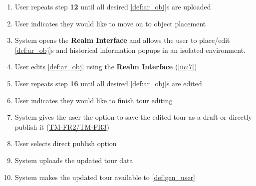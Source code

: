 \documentclass{article}
\begin{document}
\begin{enumerate}[label=\textbf{UC\arabic*}]
\begin{enumerate}[label=\textbf{\arabic*.}]
              \item User repeats step \textbf{12} until all desired \ref{def:ar_obj}s are uploaded
              \item User indicates they would like to move on to object placement
              \item System opens the \textbf{Realm Interface} and allows the user to place/edit \ref{def:ar_obj}s and historical information popups in an isolated environment.
              \item User edits \ref{def:ar_obj} using the \textbf{Realm Interface} (\ref{uc:7})
              \item User repeats step \textbf{16} until all desired \ref{def:ar_obj}s are edited
              \item User indicates they would like to finish tour editing
              \item System gives the user the option to save the edited tour as a draft or directly publish it (\hyperref[ssub:tour_management]{TM-FR2/TM-FR3})
              \item User selects direct publish option
              \item System uploads the updated tour data
              \item System makes the updated tour available to \ref{def:gen_user}
          \end{enumerate}


\end{enumerate}
\end{document}
